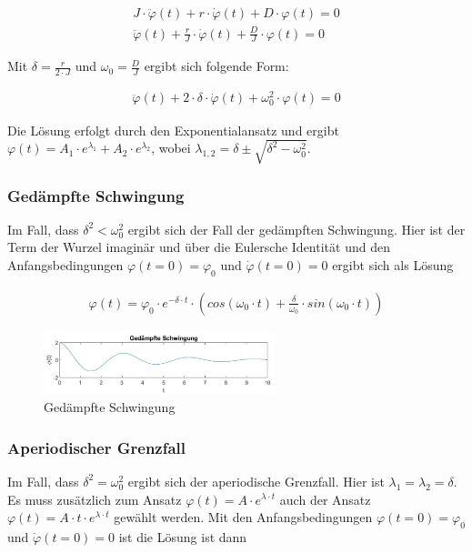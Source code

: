 \documentclass{article}
\begin{document}
\begin{gather} \label{eq:ged_schw_diff}
    J \cdot \ddot \varphi(t) + r \cdot \dot \varphi(t) + D \cdot \varphi(t) = 0 \\
    \ddot \varphi(t) + \frac{r}{J} \cdot \dot \varphi(t) + \frac{D}{J} \cdot \varphi(t) = 0
\end{gather}

\noindent Mit $\delta = \frac{r}{2 \cdot J}$ und $\omega_0 = \frac{D}{J}$ ergibt sich folgende Form:

\begin{gather} \label{eq:ged_schw_delta_omega}
    \ddot \varphi(t) + 2 \cdot \delta \cdot \dot \varphi(t) + \omega_0^2 \cdot \varphi(t) = 0
\end{gather}

Die Lösung erfolgt durch den Exponentialansatz und ergibt $\varphi(t) = A_1 \cdot e^{\lambda_1} + A_2 \cdot e^{\lambda_2}$, wobei
$\lambda_{1,2} = \delta \pm \sqrt{\delta^2 - \omega_0^2}$.

\subsubsection{Gedämpfte Schwingung}
Im Fall, dass $\delta^2 < \omega_0^2$ ergibt sich der Fall der gedämpften Schwingung. Hier ist der Term der Wurzel imaginär und
über die Eulersche Identität und den Anfangsbedingungen $\varphi(t = 0) = \varphi_0$ und $\dot \varphi(t = 0) = 0$
ergibt sich als Lösung 

\begin{gather} \label{eq:ged_schw_loes}
    \varphi(t) = \varphi_0 \cdot e^{-\delta \cdot t} \cdot (cos(\omega_0 \cdot t) + \frac{\delta}{\omega_0} \cdot sin(\omega_0 \cdot t))
\end{gather}

\begin{figure}[H]
    \centering
    \includegraphics[width=0.6\textwidth]{bilder/schwingung_gedampft.png}
    \caption{Gedämpfte Schwingung}
    \label{fig:schw_ged}
\end{figure}

\subsubsection{Aperiodischer Grenzfall}
Im Fall, dass $\delta^2 = \omega_0^2$ ergibt sich der aperiodische Grenzfall. Hier ist $\lambda_1 = \lambda_2 = \delta$.
Es muss zusätzlich zum Ansatz $\varphi(t) = A \cdot e^{\lambda \cdot t}$ auch der Ansatz $\varphi(t) = A \cdot t \cdot e^{\lambda \cdot t}$
gewählt werden. Mit den Anfangsbedingungen $\varphi(t = 0) = \varphi_0$ und $\dot \varphi(t = 0) = 0$ ist die Lösung ist dann
\end{document}
